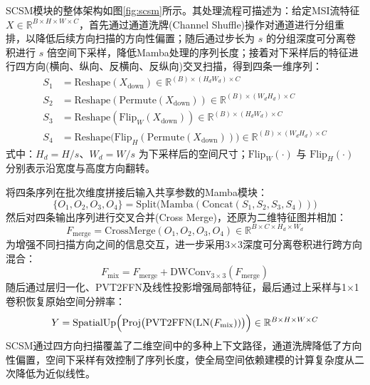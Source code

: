 \documentclass[UTF8,a4paper,11pt]{ctexart}
\begin{document}
SCSM模块的整体架构如图\ref{fig:scsm}所示。其处理流程可描述为：给定MSI流特征 $X \in \mathbb{R}^{B \times H \times W \times C}$，首先通过通道洗牌(Channel Shuffle)操作对通道进行分组重排，以降低后续方向扫描的方向性偏置；随后通过步长为 $s$ 的分组深度可分离卷积进行 $s$ 倍空间下采样，降低Mamba处理的序列长度；接着对下采样后的特征进行四方向(横向、纵向、反横向、反纵向)交叉扫描，得到四条一维序列：
\begin{equation}
\begin{aligned}
S_1 &= \mathrm{Reshape}(X_{\mathrm{down}}) \in \mathbb{R}^{(B) \times (H_d W_d) \times C} \\
S_2 &= \mathrm{Reshape}(\mathrm{Permute}(X_{\mathrm{down}})) \in \mathbb{R}^{(B) \times (W_d H_d) \times C} \\
S_3 &= \mathrm{Reshape}(\mathrm{Flip}_W(X_{\mathrm{down}})) \in \mathbb{R}^{(B) \times (H_d W_d) \times C} \\
S_4 &= \mathrm{Reshape}\bigl(\mathrm{Flip}_H(\mathrm{Permute}(X_{\mathrm{down}}))\bigr) \in \mathbb{R}^{(B) \times (W_d H_d) \times C}
\end{aligned}
\label{eq:scsm_scan}
\end{equation}
式中：$H_d = H/s$、$W_d = W/s$ 为下采样后的空间尺寸；$\mathrm{Flip}_W(\cdot)$ 与 $\mathrm{Flip}_H(\cdot)$ 分别表示沿宽度与高度方向翻转。

将四条序列在批次维度拼接后输入共享参数的Mamba模块：
\begin{equation}
  \{O_1, O_2, O_3, O_4\} = \mathrm{Split}\bigl(\mathrm{Mamba}(\mathrm{Concat}(S_1, S_2, S_3, S_4))\bigr)
  \label{eq:scsm_mamba}
\end{equation}
然后对四条输出序列进行交叉合并(Cross Merge)，还原为二维特征图并相加：
\begin{equation}
  F_{\mathrm{merge}} = \mathrm{CrossMerge}(O_1, O_2, O_3, O_4) \in \mathbb{R}^{B \times C \times H_d \times W_d}
  \label{eq:scsm_merge}
\end{equation}
为增强不同扫描方向之间的信息交互，进一步采用3$\times$3深度可分离卷积进行跨方向混合：
\begin{equation}
  F_{\mathrm{mix}} = F_{\mathrm{merge}} + \mathrm{DWConv}_{3\times 3}(F_{\mathrm{merge}})
  \label{eq:scsm_mix}
\end{equation}
随后通过层归一化、PVT2FFN及线性投影增强局部特征，最后通过上采样与1$\times$1卷积恢复原始空间分辨率：
\begin{equation}
  Y = \mathrm{SpatialUp}\Bigl(\mathrm{Proj}\bigl(\mathrm{PVT2FFN}(\mathrm{LN}(F_{\mathrm{mix}}))\bigr)\Bigr) \in \mathbb{R}^{B \times H \times W \times C}
  \label{eq:scsm_out}
\end{equation}
SCSM通过四方向扫描覆盖了二维空间中的多种上下文路径，通道洗牌降低了方向性偏置，空间下采样有效控制了序列长度，使全局空间依赖建模的计算复杂度从二次降低为近似线性。
\end{document}
